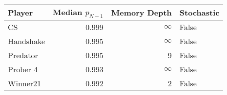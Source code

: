 \begin{tabular}{lrrl}
\toprule
    Player &  Median $p_{N-1}$ &  Memory Depth & Stochastic \\
\midrule
        CS &             0.999 &            \(\infty\) &      False \\
 Handshake &             0.995 &            \(\infty\) &      False \\
  Predator &             0.995 &             9 &      False \\
  Prober 4 &             0.993 &            \(\infty\) &      False \\
  Winner21 &             0.992 &             2 &      False \\
\bottomrule
\end{tabular}
